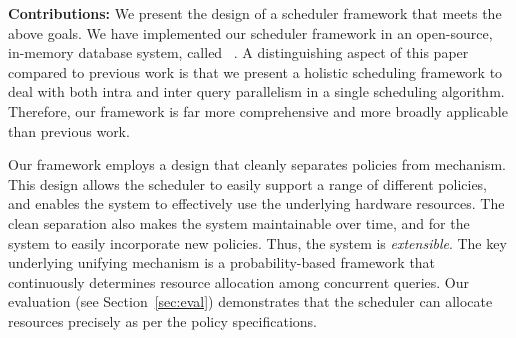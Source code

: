 %
\textbf{Contributions:} We present the design of a scheduler framework that meets the above goals. 
We have implemented our scheduler framework in an open-source, in-memory database system, called \sys{}~\cite{quickstep}.
A distinguishing aspect of this paper compared to previous work
is that we present a holistic scheduling framework to deal with both intra and inter query parallelism in a single scheduling algorithm. 
Therefore, our framework is far more comprehensive and more broadly applicable than previous work.

Our framework employs a design that cleanly separates policies from mechanism. 
This design allows the scheduler to easily support a range of different policies, and enables the system to effectively use the underlying hardware resources. 
The clean separation also makes the system maintainable over time, and for the system to easily incorporate new policies. 
Thus, the system is \textit{extensible}. 
The key underlying unifying mechanism is a probability-based framework that continuously determines resource allocation among concurrent queries.
Our evaluation (see Section~\ref{sec:eval}) demonstrates that the scheduler can allocate resources precisely as per the policy specifications. 

